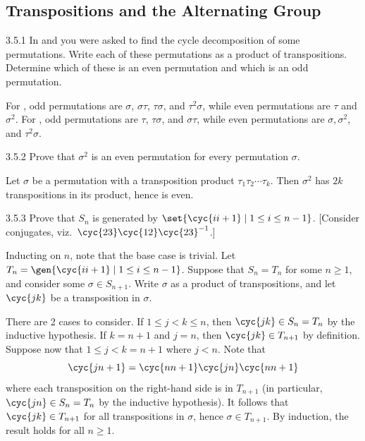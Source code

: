 \subsection{Transpositions and the Alternating Group}

\begin{exercise}{3.5.1}
    In  and  you were asked to find the cycle decomposition of some permutations.
	Write each of these permutations as a product of transpositions.
	Determine which of these is an even permutation and which is an odd permutation.
\end{exercise}

\begin{sol}
    For , odd permutations are $\sigma$, $\sigma\tau$, $\tau\sigma$, and $\tau^2\sigma$, while even permutations are $\tau$ and $\sigma^2$.
	For , odd permutations are $\tau$, $\tau\sigma$, and $\sigma\tau$, while even permutations are $\sigma, \sigma^2$, and $\tau^2\sigma$.
\end{sol}

\begin{exercise}{3.5.2}
    Prove that $\sigma^2$ is an even permutation for every permutation $\sigma$.
\end{exercise}

\begin{sol}
    Let $\sigma$ be a permutation with a transposition product $\tau_1\tau_2 \cdots \tau_k$.
	Then $\sigma^2$ has $2k$ transpositions in its product, hence is even.
\end{sol}

\begin{exercise}{3.5.3}
    Prove that $S_n$ is generated by $\set{\cyc{i i+1}\mid 1 \le i \le n-1}$. [Consider conjugates, viz.\ $\cyc{2 3}\cyc{1 2}\cyc{2 3}^{-1}$.]
\end{exercise}

\begin{sol}
    Inducting on $n$, note that the base case is trivial.
	Let $T_n = \gen{\cyc{i i + 1} \mid 1 \leq i \leq n - 1}$.
	Suppose that $S_n = T_n$ for some $n \geq 1$, and consider some $\sigma \in S_{n + 1}$.
	Write $\sigma$ as a product of transpositions, and let $\cyc{j k}$ be a transposition in $\sigma$.

    There are 2 cases to consider.
	If $1 \leq j < k \leq n$, then $\cyc{j k} \in S_n = T_n$ by the inductive hypothesis.
	If $k = n + 1$ and $j = n$, then $\cyc{j k} \in T_{n + 1}$ by definition.
	Suppose now that $1 \leq j < k = n + 1$ where $j < n$.
	Note that
    \[
    	\cyc{j n + 1} = \cyc{n n + 1}\cyc{j n}\cyc{n n + 1}
    \]
    where each transposition on the right-hand side is in $T_{n + 1}$ (in particular, $\cyc{j n} \in S_n = T_n$ by the inductive hypothesis).
	It follows that $\cyc{j k} \in T_{n + 1}$ for all transpositions in $\sigma$, hence $\sigma \in T_{n + 1}$.
	By induction, the result holds for all $n \geq 1$.
\end{sol}


